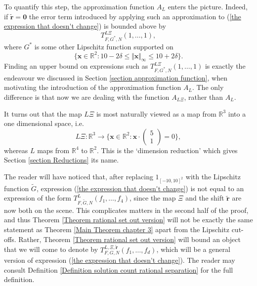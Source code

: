\documentclass[12pt,a4paper,twoside,reqno]{amsart}
\numberwithin{equation}{section}
\begin{document}
To quantify this step, the approximation function $A_L$ enters the picture. Indeed, if $\widetilde{\mathbf{r}} = \mathbf{0}$ the error term introduced by applying such an approximation to (\ref{the expression that doesn't change}) is bounded above by \[ T_{F,G^*,N}^{L\Xi}(1,\dots,1),\] where $G^*$ is some other Lipschitz function supported on \[\{ \mathbf{x} \in \mathbb{R}^2 : 10- 2 \delta \leqslant \Vert \mathbf{x}\Vert_\infty \leqslant 10 + 2 \delta \}.\] Finding an upper bound on expressions such as $ T_{F,G^*,N}^{L\Xi}(1,\dots,1)$ is exactly the endeavour we discussed in Section \ref{section approximation function}, when motivating the introduction of the approximation function $A_L$. The only difference is that now we are dealing with the function $A_{L\Xi}$, rather than $A_L$. 

It turns out that the map $L\Xi$ is most naturally viewed as a map from $\mathbb{R}^3$ into a one dimensional space, i.e. \[ L\Xi: \mathbb{R}^3 \longrightarrow \{ \mathbf{x} \in \mathbb{R}^2 : \mathbf{x} \cdot \left(\begin{matrix}5 \\ 1 \end{matrix}\right) = 0 \},\] whereas $L$ maps from $\mathbb{R}^4$ to $\mathbb{R}^2$. This is the `dimension reduction' which gives Section \ref{section Reductions} its name. 

The reader will have noticed that, after replacing $1_{[-10,10]^2}$ with the Lipschitz function $\widetilde{G}$, expression (\ref{the expression that doesn't change}) is not equal to an expression of the form $T_{F,\widetilde{G},N}^L(f_1,\dots,f_4)$, since the map $\Xi$ and the shift $\widetilde{\mathbf{r}}$ are now both on the scene. This complicates matters in the second half of the proof, and thus Theorem \ref{Theorem rational set out version} will not be exactly the same statement as Theorem \ref{Main Theorem chapter 3} apart from the Lipschitz cut-offs. Rather, Theorem \ref{Theorem rational set out version} will bound an object that we will come to denote by $T_{F,G,N}^{L,\Xi,\widetilde{\mathbf{r}}}(f_1,\dots,f_d)$, which will be a general version of expression (\ref{the expression that doesn't change}). The reader may consult Definition \ref{Definition solution count rational separation} for the full definition.\\
\end{document}
